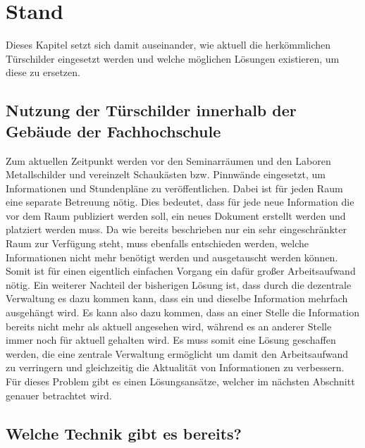\chapter{ Stand }\label{chap:Stand}
\vspace{-3cm}
\begin{flushleft}
Dieses Kapitel setzt sich damit auseinander, wie aktuell die herkömmlichen Türschilder eingesetzt werden und welche möglichen Lösungen existieren, um diese zu ersetzen.

\section{Nutzung der Türschilder innerhalb der Gebäude der Fachhochschule} 
Zum aktuellen Zeitpunkt werden vor den Seminarräumen und den Laboren Metallschilder und vereinzelt Schaukästen bzw. Pinnwände eingesetzt, um Informationen und Stundenpläne zu veröffentlichen. Dabei ist für jeden Raum eine separate Betreuung nötig. Dies bedeutet, dass für jede neue Information die vor dem Raum publiziert werden soll, ein neues Dokument erstellt werden und platziert werden muss. Da wie bereits beschrieben nur ein sehr eingeschränkter Raum zur Verfügung steht, muss ebenfalls entschieden werden, welche Informationen nicht mehr benötigt werden und ausgetauscht werden können. Somit ist für einen eigentlich einfachen Vorgang ein dafür großer Arbeitsaufwand nötig. Ein weiterer Nachteil der bisherigen Lösung ist, dass durch die dezentrale Verwaltung es dazu kommen kann, dass ein und dieselbe Information mehrfach ausgehängt wird. Es kann also dazu kommen, dass an einer Stelle die Information bereits nicht mehr als aktuell angesehen wird, während es an anderer Stelle immer noch für aktuell gehalten wird. Es muss somit eine Lösung geschaffen werden, die eine zentrale Verwaltung ermöglicht um damit den Arbeitsaufwand zu verringern und gleichzeitig die Aktualität von Informationen zu verbessern. 
Für dieses Problem gibt es einen Lösungsansätze, welcher im nächsten Abschnitt genauer betrachtet wird. 

\section{Welche Technik gibt es bereits?}
\end{flushleft}


